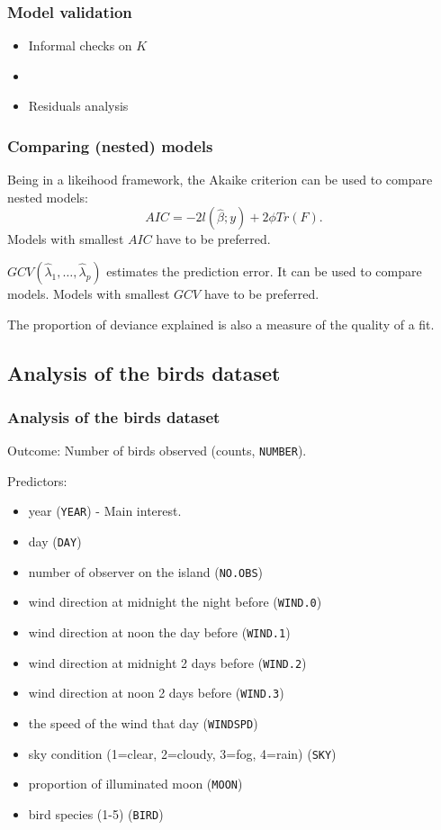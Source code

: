 \documentclass{beamer}
\newcommand{\bs}{\bigskip}
\begin{document}
\begin{frame}
\frametitle{Model validation}

\begin{itemize}
\item Informal checks on $K$  
\item[]
\item Residuals analysis
\end{itemize}

\end{frame}

\begin{frame}
\frametitle{Comparing (nested) models}

Being in a likeihood framework, the Akaike criterion can be used to compare nested models:
$$AIC = -2 l(\hat{\beta};y) + 2 \phi Tr(F).$$
Models with smallest $AIC$ have to be preferred.

\bs
$GCV(\hat{\lambda}_1, \ldots,\hat{\lambda}_p)$  estimates the prediction
error. It can be used to compare models. Models with smallest $GCV$ have to be preferred.

\bs
The proportion of deviance explained is also a measure of the quality of a fit.

\end{frame}

\subsection{Analysis of the birds dataset}
\begin{frame}
\frametitle{Analysis of the birds dataset}

Outcome: Number of birds observed (counts, \texttt{NUMBER}).

\bs
Predictors:
\begin{itemize}
\item year (\texttt{YEAR})  - {\color{blue}Main interest}.
\item day (\texttt{DAY}) 
\item number
of observer on the island (\texttt{NO.OBS}) 
\item wind direction at midnight the night before (\texttt{WIND.0}) 
\item wind direction at noon the day before (\texttt{WIND.1}) 
\item wind direction at midnight 2 days before (\texttt{WIND.2}) 
\item wind direction at noon 2 days before (\texttt{WIND.3}) 
\item the speed of the wind that day (\texttt{WINDSPD}) 
\item sky condition (1=clear, 2=cloudy, 3=fog, 4=rain) (\texttt{SKY})
\item proportion of illuminated moon (\texttt{MOON}) 
\item bird species (1-5) (\texttt{BIRD})
\end{itemize}

\end{frame}
\end{document}

